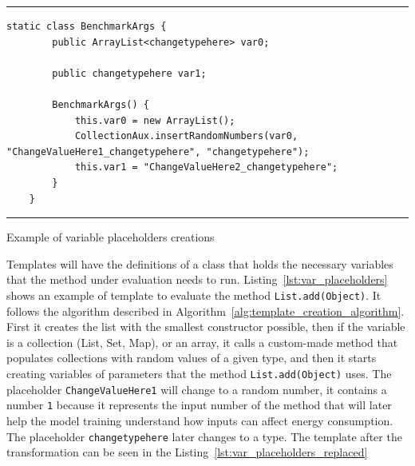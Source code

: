 \begin{listing}[htbp]
\noindent\rule{\linewidth}{0.4pt}
\begin{verbatim}
static class BenchmarkArgs {
        public ArrayList<changetypehere> var0;

        public changetypehere var1;

        BenchmarkArgs() {
            this.var0 = new ArrayList();
            CollectionAux.insertRandomNumbers(var0, "ChangeValueHere1_changetypehere", "changetypehere");
            this.var1 = "ChangeValueHere2_changetypehere";
        }
    }
\end{verbatim}
\noindent\rule{\linewidth}{0.4pt}
\caption{Example of variable placeholders creations}            
\label{lst:var_placeholders}
\end{listing}

Templates will have the definitions of a class that holds the necessary variables that the method under evaluation needs to run. Listing~\ref{lst:var_placeholders} shows an example of template to evaluate the method \texttt{List.add(Object)}. It follows the algorithm described in Algorithm~\ref{alg:template_creation_algorithm}. First it creates the list with the smallest constructor possible, then if the variable is a collection (List, Set, Map), or an array, it calls a custom-made method that populates collections with random values of a given type, and then it starts creating variables of parameters that the method \texttt{List.add(Object)} uses. The placeholder \texttt{ChangeValueHere1} will change to a random number, it contains a number \texttt{1} because it represents the input number of the method that will later help the model training understand how inputs can affect energy consumption. The placeholder \texttt{changetypehere} later changes to a type. The template after the transformation can be seen in the Listing~\ref{lst:var_placeholders_replaced}




